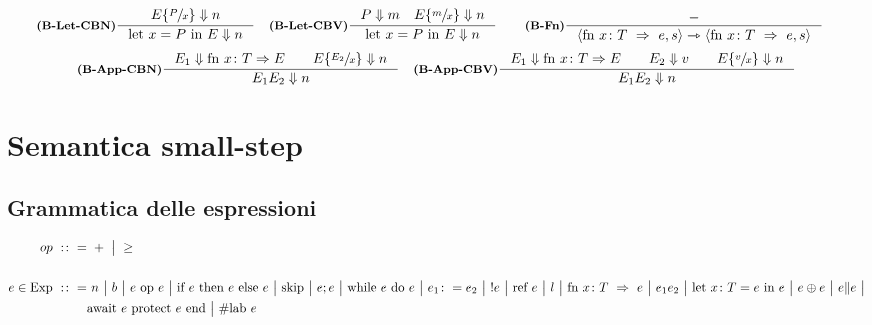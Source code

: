 \documentclass[a4paper, 10pt]{article}
\theoremstyle{definition}
\newcommand{\infer}[4]{\inference[\textbf{#1}]{#2}{#3}#4 }
\newcommand{\bbrule}[2]{ #1 \Downarrow #2}
\newcommand{\srule}[2]{\langle #1 \rangle \rightarrowtriangle \langle #2 \rangle}
\newcommand{\letin}[2]{\text{let } #1 \text{ in } #2}
\newcommand{\subs}[3]{#1 \lbrace \sfrac{#2}{#3} \rbrace}
\begin{document}
	\begin{align*}
		&\infer{(B-Let-CBN)}{\bbrule{\subs{E}{P}{x}}{n}}{\bbrule{\letin{x = P}{E}}{n}}{} 
		&\infer{(B-Let-CBV)}{\bbrule{P}{m}\quad \bbrule{\subs{E}{m}{x}}{n}}{\bbrule{\letin{x = P}{E}}{n}}{}\qquad
		&\infer{(B-Fn)}{-}{\srule{\text{fn } x\colon T\ \Rightarrow\ e, s}{\text{fn } x\colon T\ \Rightarrow\ e, s}}{}
	\end{align*}
	\begin{align*}
		&\infer{(B-App-CBN)}{\bbrule{E_1}{\text{fn } x\colon T \Rightarrow E}\qquad \bbrule{\subs{E}{E_2}{x}}{n}}{\bbrule{E_1 E_2}{n}}{}
		&\infer{(B-App-CBV)}{\bbrule{E_1}{\text{fn } x\colon T \Rightarrow E}\qquad \bbrule{E_2}{v}\qquad \bbrule{\subs{E}{v}{x}}{n}}{\bbrule{E_1 E_2}{n}}{}
	\end{align*}

	\newpage
	
\section*{Semantica small-step}
\subsection*{Grammatica delle espressioni}
\begin{minipage}{.45\linewidth}
	\begin{flushleft}
	\begin{align*}
		op\ :\colon =&\ +\ \big|\ \geq \\ \\
		e\in \textup{Exp}\ :\colon =&\ n\ \big|\ b\ \big|\ e\ \textup{op}\ e\ \big|\ \textup{if}\ e\ \textup{then}\ e\ \textup{else}\ e\ \big|\ \textup{skip}\ \big|\ e;e\ \big|\ \textup{while}\ e\ \textup{do}\ e\ \big|\ e_1 \colon = e_2\ \big|\ !e\ \big|\ \text{ref } e\ \big|\ l\ \big|\
		 \text{fn } x\colon T\ \Rightarrow\ e\ \big|\ e_1 e_2\ \big|\  \text{let } x\colon T = e\ \textup{in } e\ \big|\ e\oplus e\ \big|\ e\| e\ \big|\\ 
		 &\textup{await}\ e\ \textup{protect}\ e\ \textup{end}\ \big| \ \# \text{lab } e
	\end{align*}
	\end{flushleft}
\end{minipage}
\end{document}
